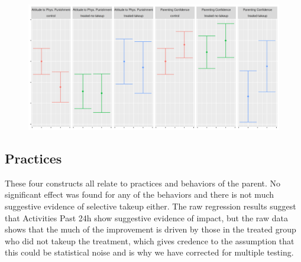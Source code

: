 \documentclass{article}
\begin{document}

\begin{figure}[H]
  \centering
\includegraphics[width=\textwidth]{plots/pre_post/Pooled: Parenting Confidence.png}
\end{figure}


\subsection*{Practices}

These four constructs all relate to practices and behaviors of the parent. No significant effect was found for any of the behaviors and there is not much suggestive evidence of selective takeup either. The raw regression results suggest that Activities Past 24h show suggestive evidence of impact, but the raw data shows that the much of the improvement is driven by those in the treated group who did not takeup the treatment, which gives credence to the assumption that this could be statistical noise and is why we have corrected for multiple testing.


\end{document}
